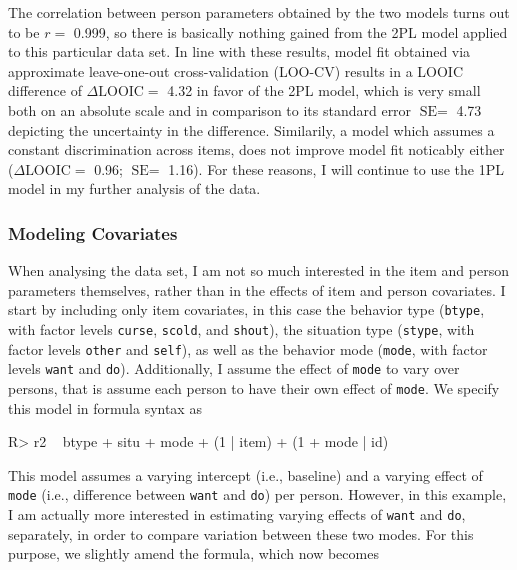 \documentclass[jss]{jss}
\begin{document}
The correlation between person parameters obtained by the two models
turns out to be \(r =\) 0.999, so there is basically nothing gained from
the 2PL model applied to this particular data set. In line with these
results, model fit obtained via approximate leave-one-out
cross-validation (LOO-CV) results in a LOOIC difference of
\(\Delta \text{LOOIC} =\) 4.32 in favor of the 2PL model, which is very
small both on an absolute scale and in comparison to its standard error
\(\text{SE} =\) 4.73 depicting the uncertainty in the difference.
Similarily, a model which assumes a constant discrimination across
items, does not improve model fit noticably either
(\(\Delta \text{LOOIC} =\) 0.96; \(\text{SE} =\) 1.16). For these
reasons, I will continue to use the 1PL model in my further analysis of
the data.

\hypertarget{modeling-covariates}{%
\subsubsection{Modeling Covariates}\label{modeling-covariates}}

When analysing the  data set, I am not so much interested
in the item and person parameters themselves, rather than in the effects
of item and person covariates. I start by including only item
covariates, in this case the behavior type (\texttt{btype}, with factor
levels \texttt{curse}, \texttt{scold}, and \texttt{shout}), the
situation type (\texttt{stype}, with factor levels \texttt{other} and
\texttt{self}), as well as the behavior mode (\texttt{mode}, with factor
levels \texttt{want} and \texttt{do}). Additionally, I assume the effect
of \texttt{mode} to vary over persons, that is assume each person to
have their own effect of \texttt{mode}. We specify this model in formula
syntax as

\begin{CodeChunk}

\begin{CodeInput}
R> r2 ~ btype + situ + mode + (1 | item) + (1 + mode | id)
\end{CodeInput}
\end{CodeChunk}

This model assumes a varying intercept (i.e., baseline) and a varying
effect of \texttt{mode} (i.e., difference between \texttt{want} and
\texttt{do}) per person. However, in this example, I am actually more
interested in estimating varying effects of \texttt{want} and
\texttt{do}, separately, in order to compare variation between these two
modes. For this purpose, we slightly amend the formula, which now
becomes
\end{document}

